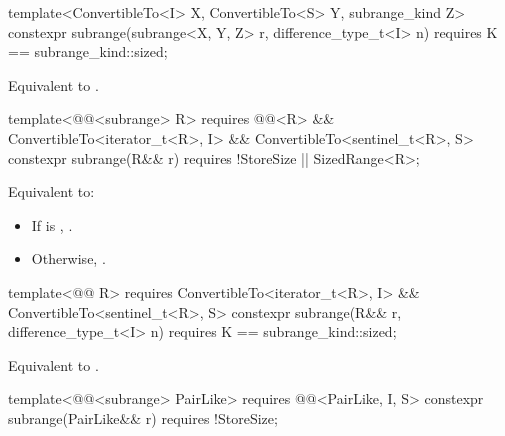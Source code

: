 {{%
\begin{itemdecl}
template<ConvertibleTo<I> X, ConvertibleTo<S> Y, subrange_kind Z>
constexpr subrange(subrange<X, Y, Z> r, difference_type_t<I> n)
  requires K == subrange_kind::sized;
\end{itemdecl}

\begin{itemdescr}
\pnum
\effects Equivalent to .
\end{itemdescr}
} %

{\color{newclr}
%
\begin{itemdecl}
template<@@<subrange> R>
  requires @@<R> &&
    ConvertibleTo<iterator_t<R>, I> && ConvertibleTo<sentinel_t<R>, S>
constexpr subrange(R&& r) requires !StoreSize || SizedRange<R>;
\end{itemdecl}

\begin{itemdescr}
\pnum
\effects Equivalent to:
\begin{itemize}
\item If  is ,
.
\item Otherwise, .
\end{itemize}
\end{itemdescr}

%
\begin{itemdecl}
template<@@ R>
  requires ConvertibleTo<iterator_t<R>, I> && ConvertibleTo<sentinel_t<R>, S>
constexpr subrange(R&& r, difference_type_t<I> n)
  requires K == subrange_kind::sized;
\end{itemdecl}

\begin{itemdescr}
\pnum
\effects Equivalent to .
\end{itemdescr}
} %

%
\begin{itemdecl}
template<@@<subrange> PairLike>
  requires @@<PairLike, I, S>
constexpr subrange(PairLike&& r) requires !StoreSize;
\end{itemdecl}

}
